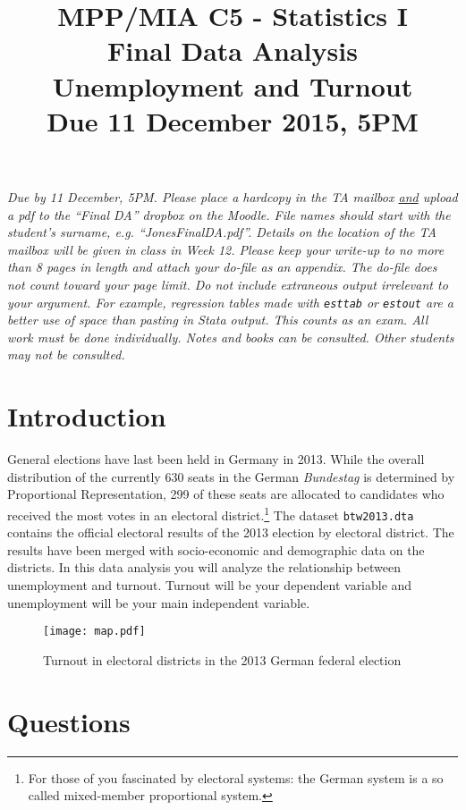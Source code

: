\documentclass[11pt,a4paper]{article}
\title{MPP/MIA C5 - Statistics I\\ \bigskip Final Data Analysis\\ \Large Unemployment and Turnout\\ Due 11 December 2015, 5PM}
\date{}
\begin{document}
\maketitle

\textit{Due by 11 December, 5PM. Please place a hardcopy in the TA mailbox \underline{and}
upload a pdf to the ``Final DA'' dropbox on the Moodle. File names should start
with the student's surname, e.g. ``JonesFinalDA.pdf''.  Details on the location of the TA mailbox will be given in class in Week 12.  Please keep your write-up to no more than 8 pages in length and attach your do-file as an appendix. The do-file does not count toward your page limit.  Do not include extraneous output irrelevant to your argument.  For example, regression tables made with \texttt{esttab} or \texttt{estout} are a better use of space than pasting in Stata output. This counts as an exam. All work must be done individually. Notes and books can be consulted. Other students may not be consulted.}

\section{Introduction}

General elections have last been held in Germany in 2013. While the overall distribution of the currently 630 seats in the German \textit{Bundestag} is determined by Proportional Representation, 299 of these seats are allocated to candidates who received the most votes in an electoral district.\footnote{For those of you fascinated by electoral systems: the German system is a so called mixed-member proportional system.} The dataset \texttt{btw2013.dta} contains the official electoral results of the 2013 election by electoral district. The results have been merged with socio-economic and demographic data on the districts. In this data analysis you will analyze the relationship between unemployment and turnout. Turnout will be your dependent variable and unemployment will be your main independent variable. 

\newpage

\begin{figure}[H]
\centering
\texttt{[image: map.pdf]}
\caption{Turnout in electoral districts in the 2013 German federal election}
\end{figure}


\section{Questions}
\end{document}
